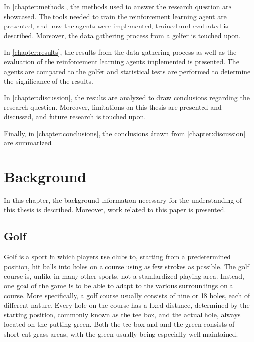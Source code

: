 \documentclass{kththesis}
\begin{document}
In \autoref{chapter:methods}, the methods used to answer the research question are showcased. The tools needed to train the reinforcement learning agent are presented, and how the agents were implemented, trained and evaluated is described. Moreover, the data gathering process from a golfer is touched upon.

In \autoref{chapter:results}, the results from the data gathering process as well as the evaluation of the reinforcement learning agents implemented is presented. The agents are compared to the golfer and statistical tests are performed to determine the significance of the results. 

In \autoref{chapter:discussion}, the results are analyzed to draw conclusions regarding the research question. Moreover, limitations on this thesis are presented and discussed, and future research is touched upon.

Finally, in \autoref{chapter:conclusions}, the conclusions drawn from \autoref{chapter:discussion} are summarized.

\chapter{Background}
\label{chapter:background}
In this chapter, the background information necessary for the understanding of this thesis is described. Moreover, work related to this paper is presented.

\section{Golf}
\label{sec:golf}
Golf is a sport in which players use clubs to, starting from a predetermined position, hit balls into holes on a course using as few strokes as possible. The golf course is, unlike in many other sports, not a standardized playing area. Instead, one goal of the game is to be able to adapt to the various surroundings on a course. More specifically, a golf course usually consists of nine or 18 holes, each of different nature. Every hole on the course has a fixed distance, determined by the starting position, commonly known as the tee box, and the actual hole, always located on the putting green. Both the tee box and and the green consists of short cut grass areas, with the green usually being especially well maintained.
\end{document}
